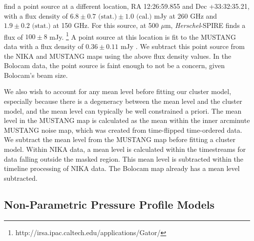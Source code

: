 \documentclass[twocolumn,traditabstract]{aa}
\begin{document}
\citet{adam2015} find a point source at a different location, RA 12:26:59.855 and Dec +33:32:35.21, with a flux density of 
$6.8 \pm 0.7 \text{ (stat.)} \pm 1.0 \text{ (cal.)}$ mJy at 260 GHz and $1.9 \pm 0.2 \text{ (stat.)}$ at 150 GHz.
For this source, at 500 $\mu$m, \emph{Herschel}-SPIRE finds a flux of $100 \pm 8$ mJy.
\footnote{{http://irsa.ipac.caltech.edu/applications/Gator/}} A point source at this location is fit to the MUSTANG
data with a flux density of $0.36 \pm 0.11$ mJy \citep{romero2017}.
We subtract this point source from the NIKA and MUSTANG maps using the above flux density values.
In the Bolocam data, the point source is faint enough to not be a concern, given Bolocam's beam size.


We also wish to account for any mean level before fitting our cluster model, especially because there is a degeneracy
between the mean level and the cluster model, and the mean level can typically be well constrained a priori.
The mean level in the MUSTANG map is calculated
as the mean within the inner arcminute MUSTANG noise map, which was created from time-flipped time-ordered data.
We subtract the mean level from the MUSTANG map before fitting a cluster model.
Within NIKA data, a mean level is calculated within the timestreams for data falling outside
the masked region. This mean level is subtracted within the timeline processing of NIKA data. The Bolocam map already has
a mean level subtracted.

\subsection{Non-Parametric Pressure Profile Models}
\label{sec:np_models}
\end{document}
